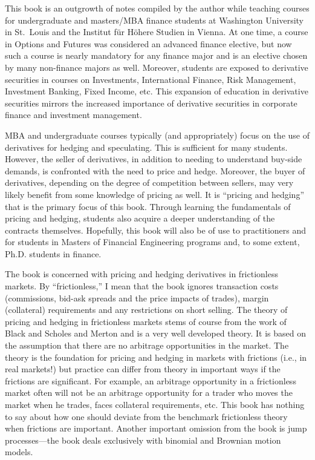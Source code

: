 \preface

This book is an outgrowth of notes compiled by the author while teaching courses for undergraduate and masters/MBA finance students  at Washington University in St.\ Louis and the Institut f\"ur H\"ohere Studien in Vienna.  At one time, a course in Options and Futures was considered an advanced finance elective, but now such a course is nearly mandatory for any finance major and is an elective chosen by many non-finance majors as well.  Moreover, students are exposed to derivative securities in courses on Investments, International Finance, Risk Management, Investment Banking, Fixed Income, etc.  This expansion of education in derivative securities mirrors the increased importance of derivative securities in corporate finance and investment management.  

MBA and undergraduate courses typically (and appropriately) focus on the use of derivatives for hedging and speculating.  This is sufficient for many students.  However, the seller of derivatives, in addition to needing to understand buy-side demands,  is confronted with the need to price and hedge.  Moreover, the buyer of derivatives, depending on the degree of competition between sellers, may very likely benefit from some knowledge of pricing as well.  It is ``pricing and hedging'' that is the primary focus of this book.  Through learning the fundamentals of pricing and hedging, students also acquire a deeper understanding of the contracts themselves.  
Hopefully, this book will also be of use to practitioners and for students in  Masters of Financial Engineering programs and, to some extent, Ph.D. students in finance.

The book is concerned with pricing and hedging derivatives in frictionless markets.  By ``frictionless,'' I mean  that the book ignores transaction costs (commissions, bid-ask spreads and the price impacts of trades), margin (collateral)  requirements and any restrictions on short selling.  The theory of pricing and hedging in frictionless markets stems of course from the work of Black and Scholes \cite{BS} and Merton \cite{Merton} and is a very well developed theory.  It is based on the assumption that there are no arbitrage opportunities in the market.  The theory is the foundation for pricing and hedging in markets with frictions (i.e., in real markets!) but practice can differ from theory in important ways if the frictions are significant.  For example, an arbitrage opportunity in a frictionless market often will not be an arbitrage opportunity for a trader who moves the market when he trades, faces collateral requirements, etc.    This book has nothing to say about how one should deviate from the benchmark frictionless theory when frictions are important.  Another important omission from the book is jump processes---the book deals exclusively with binomial and Brownian motion models.


